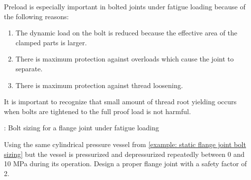 \documentclass[
10pt,
a4paper,
openany,
svgnames,
]{book}
\begin{document}
Preload is especially important in bolted joints under fatigue loading because of the following reasons:
\begin{enumerate}
\item The dynamic load on the bolt is reduced because the effective area of the clamped parts is larger.
\item There is maximum protection against overloads which cause the joint to separate.
\item There is maximum protection against thread loosening.
\end{enumerate}

It is important to recognize that small amount of thread root yielding occurs when bolts are tightened to the full proof load is not harmful.

\begin{example}: Bolt sizing for a flange joint under fatigue loading

Using the same cylindrical pressure vessel from \cref{example: static flange joint bolt sizing} but the vessel is pressurized and depressurized repeatedly between 0 and 10 MPa during its operation. Design a proper flange joint with a safety factor of 2.
\end{example}
\end{document}
